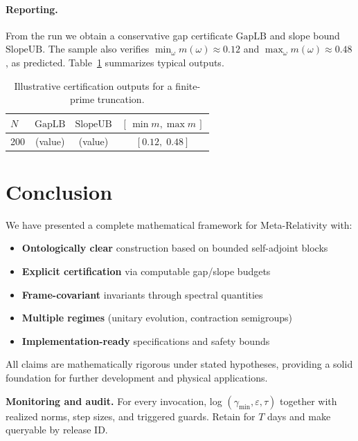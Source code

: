 \documentclass[10pt]{article}
\begin{document}
\paragraph{Reporting.}
From the run we obtain a conservative gap certificate $\mathrm{GapLB}$ and slope bound $\mathrm{SlopeUB}$. 
The sample also verifies \(\min_\omega m(\omega)\approx 0.12\) and \(\max_\omega m(\omega)\approx 0.48\), as predicted.
Table~\ref{tab:cert-demo} summarizes typical outputs.

\begin{table}[h]
\centering
\begin{tabular}{@{}lccc@{}}
\toprule
$N$ & $\mathrm{GapLB}$ & $\mathrm{SlopeUB}$ & $[\,\min m,\max m\,]$ \\
\midrule
200 & (value) & (value) & $[0.12,\;0.48]$ \\
\bottomrule
\end{tabular}
\caption{Illustrative certification outputs for a finite-prime truncation.}\label{tab:cert-demo}
\end{table}

\section{Conclusion}

We have presented a complete mathematical framework for Meta-Relativity with:
\begin{itemize}
    \item \textbf{Ontologically clear} construction based on bounded self-adjoint blocks
    \item \textbf{Explicit certification} via computable gap/slope budgets  
    \item \textbf{Frame-covariant} invariants through spectral quantities
    \item \textbf{Multiple regimes} (unitary evolution, contraction semigroups)
    \item \textbf{Implementation-ready} specifications and safety bounds
\end{itemize}

All claims are mathematically rigorous under stated hypotheses, providing a solid foundation for further development and physical applications.

\appendix


\item \textbf{Monitoring and audit.}\label{g:audit}
For every invocation, log \((\gamma_{\min}, \varepsilon, \tau)\) together with realized norms, step sizes, and triggered guards. Retain for \(T\) days and make queryable by release ID.
\end{document}
